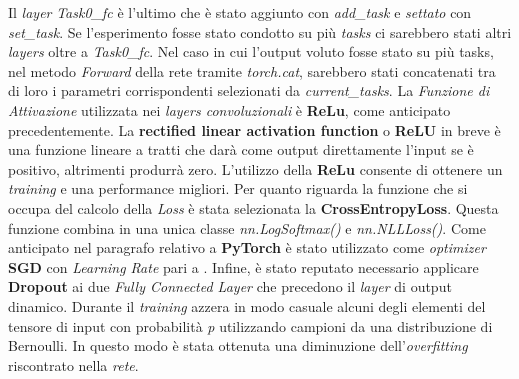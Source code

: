\newpage
Il \textit{layer} \textit{Task0\_fc} è l'ultimo che è stato aggiunto con \textit{add\_task} e \textit{settato} con \textit{set\_task}.
Se l'esperimento fosse stato condotto su più \textit{tasks} ci sarebbero stati altri \textit{layers} oltre a \textit{Task0\_fc}. Nel caso in cui l'output voluto fosse stato su più tasks, nel metodo \textit{Forward} della rete tramite \textit{torch.cat}, sarebbero stati concatenati tra di loro i parametri corrispondenti selezionati da \textit{current\_tasks}.
\newline
La \textit{Funzione di Attivazione} utilizzata nei  \textit{layers convoluzionali} è \textbf{ReLu}, come anticipato precedentemente.
La \textbf{rectified linear activation function} o \textbf{ReLU} in breve è una funzione lineare a tratti che darà  come output direttamente l'input se è positivo, altrimenti produrrà zero. L'utilizzo della \textbf{ReLu} consente di ottenere un \textit{training} e una performance migliori.
\newline
Per quanto riguarda la funzione che si occupa del calcolo della \textit{Loss} è stata selezionata la \textbf{CrossEntropyLoss}. Questa funzione combina in una unica classe \textit{nn.LogSoftmax()} e \textit{ nn.NLLLoss()}.
Come anticipato nel paragrafo relativo a \textbf{PyTorch} è stato utilizzato come \textit{optimizer} \textbf{SGD} con \textit{Learning Rate} pari a  .\newline
Infine, è stato reputato necessario applicare \textbf{Dropout} ai due \textit{Fully Connected Layer} che precedono il \textit{layer} di output dinamico. Durante il \textit{training} azzera in modo casuale alcuni degli elementi del tensore di input con probabilità \textit{p} utilizzando campioni da una distribuzione di Bernoulli. In questo modo è stata ottenuta una diminuzione dell'\textit{overfitting}  riscontrato nella \textit{rete}.
